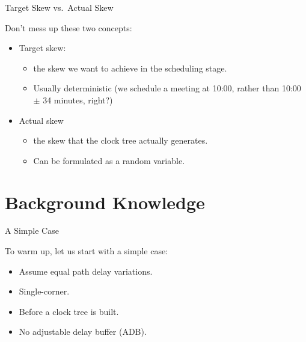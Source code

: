 \documentclass[10pt,ignorenonframetext,mathserif]{beamer}
\providecommand{\tightlist}{%
  \setlength{\itemsep}{0pt}\setlength{\parskip}{0pt}}
\begin{document}
\begin{frame}{Target Skew vs.~Actual Skew}

Don't mess up these two concepts:

\begin{itemize}
\tightlist
\item
  Target skew:

  \begin{itemize}
  \tightlist
  \item
    the skew we want to achieve in the scheduling stage.
  \item
    Usually deterministic (we schedule a meeting at 10:00, rather than
    10:00 \(\pm\) 34 minutes, right?)
  \end{itemize}
\item
  Actual skew

  \begin{itemize}
  \tightlist
  \item
    the skew that the clock tree actually generates.
  \item
    Can be formulated as a random variable.
  \end{itemize}
\end{itemize}

\end{frame}

\section{Background Knowledge}\label{background-knowledge}

\begin{frame}{A Simple Case}

To warm up, let us start with a simple case:

\begin{itemize}
\tightlist
\item
  Assume equal path delay variations.
\item
  Single-corner.
\item
  Before a clock tree is built.
\item
  No adjustable delay buffer (ADB).
\end{itemize}

\end{frame}
\end{document}
